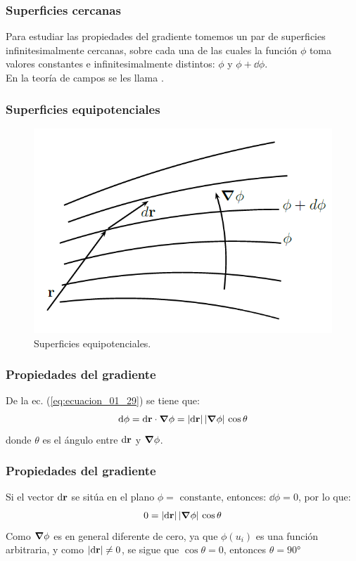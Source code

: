 \documentclass[12pt]{beamer}
\begin{document}
\begin{frame}
\frametitle{Superficies cercanas}
Para estudiar las propiedades del gradiente tomemos un par de superficies infinitesimalmente cercanas, sobre cada una de las cuales la función $\phi$ toma valores constantes e infinitesimalmente distintos: $\phi$ y $\phi + \dd{\phi}$.
\\
\bigskip
\pause
En la teoría de campos se les llama .
\end{frame}
\begin{frame}
\frametitle{Superficies equipotenciales}
\begin{figure}[h!]
    \centering
    \includegraphics[scale=0.5]{Imagenes/Superficies_Equipotenciales.png}
    \caption{Superficies equipotenciales.}
    \label{fig:Superficies_Equipotenciales}
\end{figure}
\end{frame}
\begin{frame}
\frametitle{Propiedades del gradiente}
De la ec. (\ref{eq:ecuacion_01_29}) se tiene que:
\pause
\begin{align*}
\dd{\phi} = \dd{\vb{r}} \cdot \grad{\phi} = \abs{\dd{\vb{r}}} \, \abs{\grad{\phi}} \, \cos \theta
\end{align*}
donde $\theta$ es el ángulo entre $\dd{\vb{r}}$ y $\grad{\phi}$.
\end{frame}
\begin{frame}
\frametitle{Propiedades del gradiente}
Si el vector $\dd{\vb{r}}$ se sitúa en el plano $\phi = \text{ constante}$, entonces: $\dd{\phi} = 0$, por lo que:
\pause
\begin{align*}
0 = \abs{\dd{\vb{r}}} \, \abs{\grad{\phi}} \, \cos \theta
\end{align*}
\pause
Como $\grad{\phi}$ es en general diferente de cero, ya que $\phi(u_{i})$ es una función arbitraria, y como $\abs{\dd{\vb{r}}} \neq 0$, se sigue que $\cos \theta = 0$, entonces $\theta = \ang{90}$
\end{frame}
\end{document}

